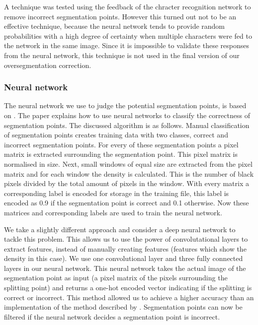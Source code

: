 \documentclass{article}
\begin{document}
A technique was tested using the feedback of the chracter recognition network to remove incorrect segmentation points.
However this turned out not to be an effective technique, because the neural network tends to provide random probabilities with a high degree of certainty when multiple characters were fed to the network in the same image.
Since it is impossible to validate these responses from the neural network, this technique is not used in the final version of our oversegmentation correction.
 

\subsubsection{Neural network}
The neural network we use to judge the potential segmentation points, is based on \cite{evalsplitpointsnn}. The paper explains how to use neural networks to classify the correctness of segmentation points. The discussed algorithm is as follows. Manual classification of segmentation points creates training data with two classes, correct and incorrect segmentation points. 
For every of these segmentation points a pixel matrix is extracted surrounding the segmentation point. This pixel matrix is normalised in size. 
Next, small windows of equal size are extracted from the pixel matrix and for each window the density is calculated. This is the number of black pixels divided by the total amount of pixels in the window. 
With every matrix a corresponding label is encoded for storage in the training file, this label is encoded as 0.9 if the segmentation point is correct and 0.1 otherwise. Now these matrices and corresponding labels are used to train the neural network. 

We take a slightly different approach and consider a deep neural network to tackle this problem. This allows us to use the power of convolutational layers to extract features, instead of manually creating features (features which show the density in this case). 
We use one convolutional layer and three fully connected layers in our neural network. This neural network takes the actual image of the segmentation point as input (a pixel matrix of the pixels surrounding the splitting point) and returns a one-hot encoded vector indicating if the splitting is correct or incorrect. 
This method allowed us to achieve a higher accuracy than an implementation of the method described by \cite{evalsplitpointsnn}.
Segmentation points can now be filtered if the neural network decides a segmentation point is incorrect. 
\end{document}
